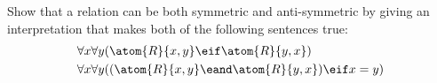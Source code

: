 \problempart
Show that a relation can be both symmetric and anti-symmetric by
giving an interpretation that makes both of the following sentences
true:
\begin{align*}
	& \forall x\forall y(\atom{R}{x,y} \eif \atom{R}{y,x})\\
	& \forall x\forall y((\atom{R}{x,y} \eand \atom{R}{y,x}) \eif x=y)
\end{align*}
